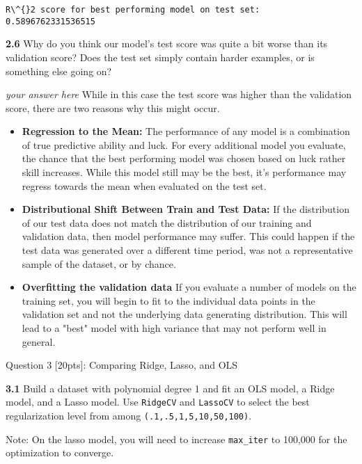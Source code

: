 \documentclass[11pt]{article}
\begin{document}
    \begin{Verbatim}[commandchars=\\\{\}]
R\^{}2 score for best performing model on test set:  0.5896762331536515

    \end{Verbatim}

    \textbf{2.6} Why do you think our model's test score was quite a bit
worse than its validation score? Does the test set simply contain harder
examples, or is something else going on?

    \emph{your answer here} While in this case the test score was higher
than the validation score, there are two reasons why this might occur.

\begin{itemize}
\item
  \textbf{Regression to the Mean:} The performance of any model is a
  combination of true predictive ability and luck. For every additional
  model you evaluate, the chance that the best performing model was
  chosen based on luck rather skill increases. While this model still
  may be the best, it's performance may regress towards the mean when
  evaluated on the test set.
\item
  \textbf{Distributional Shift Between Train and Test Data:} If the
  distribution of our test data does not match the distribution of our
  training and validation data, then model performance may suffer. This
  could happen if the test data was generated over a different time
  period, was not a representative sample of the dataset, or by chance.
\item
  \textbf{Overfitting the validation data} If you evaluate a number of
  models on the training set, you will begin to fit to the individual
  data points in the validation set and not the underlying data
  generating distribution. This will lead to a "best" model with high
  variance that may not perform well in general.
\end{itemize}

     Question 3 {[}20pts{]}: Comparing Ridge, Lasso, and OLS 

    \textbf{3.1} Build a dataset with polynomial degree 1 and fit an OLS
model, a Ridge model, and a Lasso model. Use \texttt{RidgeCV} and
\texttt{LassoCV} to select the best regularization level from among
\texttt{(.1,.5,1,5,10,50,100)}.

Note: On the lasso model, you will need to increase \texttt{max\_iter}
to 100,000 for the optimization to converge.
\end{document}
